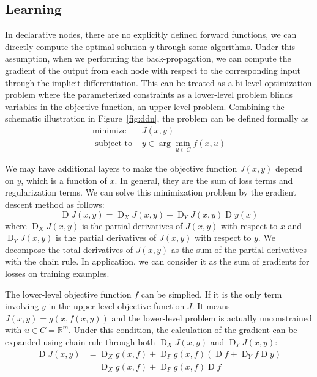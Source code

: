 \subsection{Learning}
In declarative nodes, there are no explicitly defined forward functions, we can directly compute the optimal solution $y$ through some algorithms. Under this assumption, when we performing the back-propagation, we can compute the gradient of the output from each node with respect to the corresponding input through the implicit differentiation. This can be treated as a bi-level optimization problem\citep{BJ:98} where the parameterized constraints as a lower-level problem blinds variables in the objective function, an upper-level problem. Combining the schematic illustration in Figure~\ref{fig:ddn}, the problem can be defined formally as
\begin{equation}
    \begin{array}{ll}\operatorname{minimize} & J(x, y) \\ \text { subject to } & y \in \arg \min _{u \in C} f(x, u)\end{array}
\end{equation}
\par We may have additional layers to make the objective function $J(x, y)$ depend on $y$, which is a function of $x$. In general, they are the sum of loss terms and regularization terms. We can solve this minimization problem by the gradient descent method as follows:
\begin{equation}
    \operatorname{D}J(x,y) = \operatorname{D}_XJ(x,y) + \operatorname{D}_YJ(x,y)\operatorname{D}y(x)
\end{equation}
where $\operatorname{D}_XJ(x,y)$ is the partial derivatives of $J(x,y)$ with respect to $x$ and $\operatorname{D}_YJ(x,y)$ is the partial derivatives of $J(x,y)$ with respect to $y$. We decompose the total derivatives of $J(x,y)$ as the sum of the partial derivatives with the chain rule. In application, we can consider it as the sum of gradients for losses on training examples. 
\par The lower-level objective function $f$ can be simplied. If it is the only term involving $y$ in the upper-level objective function $J$. It means $J(x,y) = g(x, f(x,y))$ and the lower-level problem is actually unconstrained with $u \in C=\mathbb{R}^m$. Under this condition, the calculation of the gradient can be expanded using chain rule through both $\operatorname{D}_XJ(x,y)$ and $\operatorname{D}_YJ(x,y)$:
\begin{equation}
    \begin{aligned} 
        \operatorname{D} J(x, y) &=\operatorname{D}_{X} g(x, f)+\operatorname{D}_{F} g(x, f)\left(\operatorname{D} f+\operatorname{D}_{Y} f \operatorname{D} y\right) \\ &=\operatorname{D}_{X} g(x, f)+\operatorname{D}_{F} g(x, f) \operatorname{D} f 
    \end{aligned}
\end{equation}
